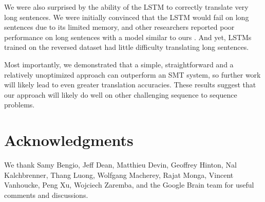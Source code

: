 \documentclass{article}
\begin{document}
We were also surprised by the ability of the LSTM to correctly
translate very long sentences.  We were initially convinced that the
LSTM would fail on long sentences due to its limited memory, and other
researchers reported poor performance on long sentences with a model
similar to ours \cite{cho14,bog14,curse}.  And yet,
LSTMs trained on the reversed dataset had little difficulty translating long
sentences.

Most importantly, we demonstrated that a simple, straightforward and a
relatively unoptimized approach can outperform an SMT system, so
further work will likely lead to even greater translation accuracies.  
These results suggest that our approach will likely   
do well on other challenging sequence to sequence problems.

\small
\section{Acknowledgments}

We thank Samy Bengio, Jeff Dean, Matthieu Devin, Geoffrey Hinton, Nal Kalchbrenner, Thang Luong, Wolfgang
Macherey, Rajat Monga, Vincent Vanhoucke, Peng Xu, Wojciech Zaremba,
and the Google Brain team for useful comments and discussions.

 

\end{document}

